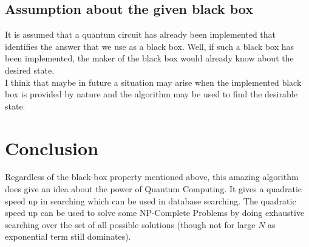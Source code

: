\documentclass[a4paper]{article}
\begin{document}
\subsection{Assumption about the given black box}
It is assumed that a quantum circuit has already been implemented that identifies the answer that we use as a black box. Well, if such a black box has been implemented, the maker of the black box would already know about the desired state.\\
I think that maybe in future a situation may arise when the implemented black box is provided by nature and the algorithm may be used to find the desirable state.\\

\section{Conclusion}

Regardless of the black-box property mentioned above, this amazing algorithm does give an idea about the power of Quantum Computing. It gives a quadratic speed up in searching which can be used in database searching. The quadratic speed up can be used to solve some NP-Complete Problems by doing exhaustive searching over the set of all possible solutions (though not for large $N$ as exponential term still dominates).
\end{document}
